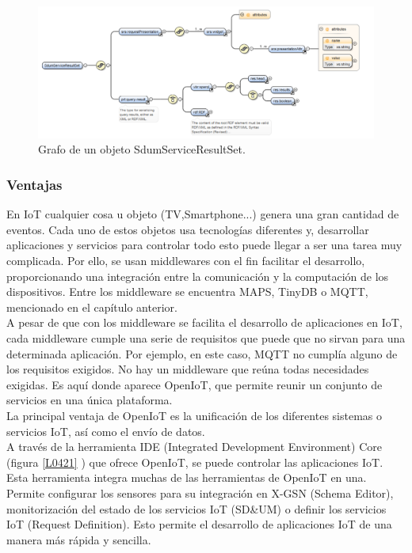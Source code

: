 \documentclass[12pt, twoside]{book}
\begin{document}
\begin{figure}[H]
\centering
\includegraphics[scale=0.5]{images/sdum_service}
\caption{Grafo de un objeto SdumServiceResultSet.}\label{L0422}
\end{figure}

\subsubsection*{Ventajas}
En IoT cualquier cosa u objeto (TV,Smartphone...) genera una gran cantidad de eventos. Cada uno de estos objetos usa tecnologías diferentes y, desarrollar aplicaciones y servicios para controlar todo esto puede llegar a ser una tarea muy complicada. Por ello, se usan middlewares con el fin facilitar el desarrollo, proporcionando una integración entre la comunicación y la computación de los dispositivos. Entre los middleware se encuentra MAPS, TinyDB o MQTT, mencionado en el capítulo anterior.\\

A pesar de que con los middleware se facilita el desarrollo de aplicaciones en IoT, cada middleware cumple una serie de requisitos que puede que no sirvan para una determinada aplicación. Por ejemplo, en este caso, MQTT no cumplía alguno de los requisitos exigidos. No hay un middleware que reúna todas necesidades exigidas. Es aquí donde aparece OpenIoT, que permite reunir un conjunto de servicios en una única plataforma.\\

La principal ventaja de OpenIoT es la unificación de los diferentes sistemas o servicios IoT, así como el envío de datos.\\

A través de la herramienta IDE (Integrated Development Environment) Core (figura \ref{L0421} ) que ofrece OpenIoT, se puede controlar las aplicaciones IoT. Esta herramienta integra muchas de las herramientas de OpenIoT en una. Permite configurar los sensores para su integración en X-GSN (Schema Editor), monitorización del estado de los servicios IoT (SD\&UM) o definir los servicios IoT (Request Definition). Esto permite el desarrollo de aplicaciones IoT de una manera más rápida y sencilla.\\
\end{document}
